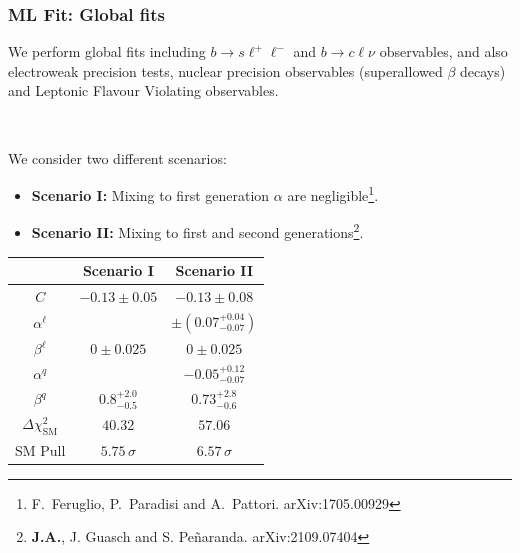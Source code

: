 \documentclass[mathserif, 10pt]{beamer}
\begin{document}
\begin{frame}\frametitle{ML Fit: Global fits}
    We perform global fits including $b\to s \ell^+\ell^-$ and
    $b\to c\ell\nu$ observables, and also electroweak precision tests,
    nuclear precision observables (superallowed $\beta$ decays) and Leptonic Flavour Violating observables.

    ~

    We consider two different scenarios:
    \begin{itemize}
        \item \textbf{Scenario I:} Mixing to first generation $\alpha$ are negligible\footnote[12]{F.~Feruglio, P.~Paradisi and A.~Pattori. arXiv:1705.00929}.
        \item \textbf{Scenario II:} Mixing to first and second generations\footnote[13]{\textbf{J.A.}, J. Guasch and S. Peñaranda. arXiv:2109.07404}.
    \end{itemize}
    \begin{center}\small
        \begin{tabular}{|c|c|c|}\hline
                                        & Scenario I          & Scenario II                  \\\hline
            $C$                         & $-0.13 \pm 0.05$    & $-0.13 \pm 0.08$             \\\hline
            $\alpha^\ell$               &                     & $\pm (0.07^{+0.04}_{-0.07})$ \\\hline
            $\beta^\ell$                & $0 \pm 0.025$       & $0 \pm 0.025$                \\\hline
            $\alpha^q$                  &                     & $-0.05^{+0.12}_{-0.07}$      \\\hline
            $\beta^q$                   & $0.8^{+2.0}_{-0.5}$ & $0.73^{+2.8}_{-0.6}$         \\\hline
            $\Delta \chi^2_\mathrm{SM}$ & $40.32$             & $57.06$                      \\\hline
            SM Pull                     & $5.75\,\sigma$      & $6.57\,\sigma$               \\\hline
        \end{tabular}
    \end{center}
\end{frame}
\end{document}
